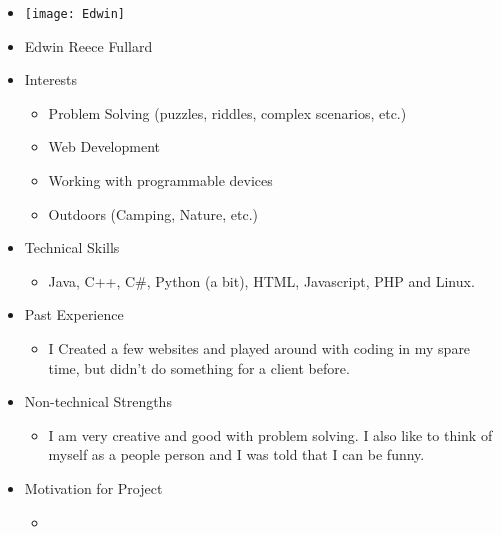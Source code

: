 
\begin{itemize}
	\item[] \texttt{[image: Edwin]}
	\item[] Edwin Reece Fullard
	\item Interests
	\begin{itemize}
		\item Problem Solving (puzzles, riddles, complex scenarios, etc.)
		\item Web Development
		\item Working with programmable devices
		\item Outdoors (Camping, Nature, etc.)
	\end{itemize}
	\item Technical Skills
	\begin{itemize}
		\item[] Java, C++, C#, Python (a bit), HTML, Javascript, PHP and Linux.
	\end{itemize}
	\item Past Experience
	\begin{itemize}
		\item[] I Created a few websites and played around with coding in my spare time, but didn't do something for a client before.
	\end{itemize}
	\item Non-technical Strengths
	\begin{itemize}
		\item[] I am very creative and good with problem solving. I also like to think of myself as a people person and I was told that I can be funny.
	\end{itemize}
	\item Motivation for Project
	\begin{itemize}
		\item[] 
	\end{itemize}
\end{itemize}